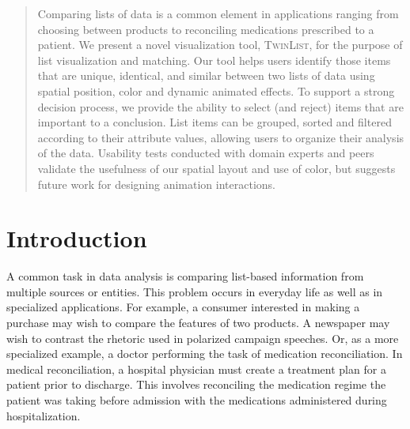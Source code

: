 \documentclass{chi2009}
\newcommand{\TwinList}{\textsc{TwinList}}
\begin{document}
\begin{abstract}
Comparing lists of data is a common element in applications ranging from choosing between products to reconciling medications prescribed to a patient. We present a novel visualization tool, \TwinList, for the purpose of list visualization and matching. Our tool helps users identify those items that are unique, identical, and similar between two lists of data using spatial position, color and dynamic animated effects. 
To support a strong decision process, we provide the ability to select (and reject) items that are important to a conclusion. List items can be grouped, sorted and filtered according to their attribute values, allowing users to organize their analysis of the data. Usability tests conducted with domain experts and peers validate the usefulness of our spatial layout and use of color, but suggests future work for designing animation interactions.


\end{abstract}



\section{Introduction}
A common task in data analysis is comparing list-based information from multiple sources or entities. This problem occurs in everyday life as well as in specialized applications. For example, a consumer interested in making a purchase may wish to compare the features of two products. A newspaper may wish to contrast the rhetoric used in polarized campaign speeches. Or, as a more specialized example, a doctor performing the task of medication reconciliation. In medical reconciliation, a hospital physician must create a treatment plan for a patient prior to discharge. This involves reconciling the medication regime the patient was taking before admission with the medications administered during hospitalization. 
\end{document}

